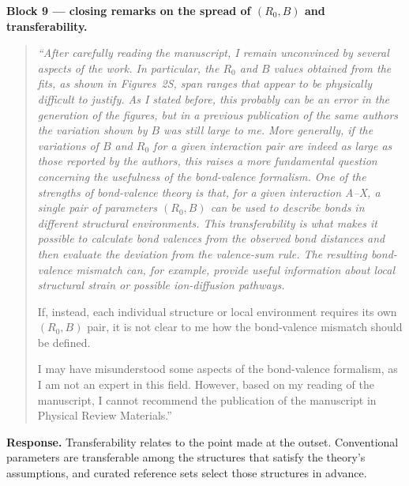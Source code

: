 \documentclass[11pt]{article}
\newenvironment{refquote}%
  {\begin{quote}\itshape\color{black!70}}%
  {\end{quote}}
\begin{document}
\textbf{Block 9 --- closing remarks on the spread of $(R_0,B)$ and
transferability.}

\begin{refquote}
``After carefully reading the manuscript, I remain unconvinced by
several aspects of the work.  In particular, the $R_0$ and $B$ values
obtained from the fits, as shown in Figures~2S, span ranges that
appear to be physically difficult to justify.  As I stated before,
this probably can be an error in the generation of the figures, but
in a previous publication of the same authors the variation shown by
$B$ was still large to me.  More generally, if the variations of $B$
and $R_0$ for a given interaction pair are indeed as large as those
reported by the authors, this raises a more fundamental question
concerning the usefulness of the bond-valence formalism.  One of the
strengths of bond-valence theory is that, for a given interaction
A--X, a single pair of parameters $(R_0,B)$ can be used to describe
bonds in different structural environments.  This transferability is
what makes it possible to calculate bond valences from the observed
bond distances and then evaluate the deviation from the valence-sum
rule.  The resulting bond-valence mismatch can, for example, provide
useful information about local structural strain or possible
ion-diffusion pathways.

If, instead, each individual structure or local environment requires
its own $(R_0,B)$ pair, it is not clear to me how the bond-valence
mismatch should be defined.

I may have misunderstood some aspects of the bond-valence formalism,
as I am not an expert in this field.  However, based on my reading of
the manuscript, I cannot recommend the publication of the manuscript
in Physical Review Materials.''
\end{refquote}

\textbf{Response.}  Transferability relates to the point made at the
outset.  Conventional parameters are transferable among the structures
that satisfy the theory's assumptions, and curated reference sets
select those structures in advance.
\end{document}
